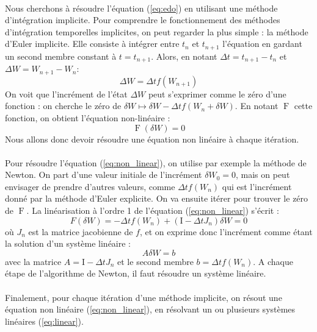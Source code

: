 \documentclass[a4paper]{article}
\begin{document}
		\paragraph{} Nous cherchons à résoudre l'équation (\ref{eq:edo}) en utilisant une méthode d'intégration implicite.
		Pour comprendre le fonctionnement des méthodes d'intégration temporelles implicites, on peut regarder la plus simple : la méthode d'Euler implicite.
		Elle consiste à intégrer entre $t_n$ et $t_{n+1}$ l'équation en gardant un second membre constant à $t = t_{n+1}$.
		Alors, en notant $\Delta t = t_{n+1} - t_n$ et $\Delta W = W_{n+1} - W_n$:
		$$\Delta W = \Delta t f\left(W_{n+1}\right)$$
		On voit que l'incrément de l'état $\Delta W$ peut s'exprimer comme le zéro d'une fonction : on cherche le zéro de $\delta W \mapsto \delta W - \Delta t f\left(W_n + \delta W\right)$.
		En notant $\operatorname{F}$ cette fonction, on obtient l'équation non-linéaire :
		\begin{equation}\label{eq:non_linear}
			\operatorname{F}\left(\delta W\right) = 0
		\end{equation}
		Nous allons donc devoir résoudre une équation non linéaire à chaque itération.

		\paragraph{} Pour résoudre l'équation (\ref{eq:non_linear}), on utilise par exemple la méthode de Newton.
		On part d'une valeur initiale de l'incrément $\delta W_0 = 0$, mais on peut envisager de prendre d'autres valeurs, comme $\Delta t f\left(W_n\right)$ qui est l'incrément donné par la méthode d'Euler explicite.
		On va ensuite itérer pour trouver le zéro de $\operatorname{F}$.
		La linéarisation à l'ordre 1 de l'équation (\ref{eq:non_linear}) s'écrit :
		$$F(\delta W) = -\Delta t f\left(W_n\right) + \left(\mathrm{I} - \Delta t J_n\right)\delta W = 0$$
		où $J_n$ est la matrice jacobienne de $f$, et on exprime donc l'incrément comme étant la solution d'un système linéaire :
		\begin{equation}\label{eq:linear}A\delta W = b\end{equation}
		avec la matrice $A = \mathrm{I} - \Delta t J_n$ et le second membre $b = \Delta t f\left(W_n\right)$.
		A chaque étape de l'algorithme de Newton, il faut résoudre un système linéaire.

		\paragraph{} Finalement, pour chaque itération d'une méthode implicite, on résout une équation non linéaire (\ref{eq:non_linear}), en résolvant un ou plusieurs systèmes linéaires (\ref{eq:linear}).
\end{document}
